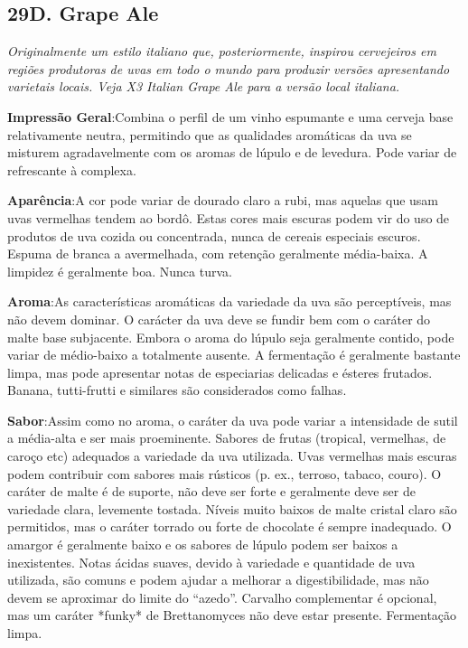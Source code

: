 \subsection*{29D. Grape Ale}
\textit{Originalmente um estilo italiano que, posteriormente, inspirou cervejeiros em regiões produtoras de uvas em todo o mundo para produzir versões apresentando varietais locais. Veja X3 Italian Grape Ale para a versão local italiana.}

\textbf{Impressão Geral}:Combina o perfil de um vinho espumante e uma cerveja base relativamente neutra, permitindo que as qualidades aromáticas da uva se misturem agradavelmente com os aromas de lúpulo e de levedura. Pode variar de refrescante à complexa.

\textbf{Aparência}:A cor pode variar de dourado claro a rubi, mas aquelas que usam uvas vermelhas tendem ao bordô. Estas cores mais escuras podem vir do uso de produtos de uva cozida ou concentrada, nunca de cereais especiais escuros. Espuma de branca a avermelhada, com retenção geralmente média-baixa. A limpidez é geralmente boa. Nunca turva.

\textbf{Aroma}:As características aromáticas da variedade da uva são perceptíveis, mas não devem dominar. O carácter da uva deve se fundir bem com o caráter do malte base subjacente. Embora o aroma do lúpulo seja geralmente contido, pode variar de médio-baixo a totalmente ausente. A fermentação é geralmente bastante limpa, mas pode apresentar notas de especiarias delicadas e ésteres frutados. Banana, tutti-frutti e similares são considerados como falhas.

\textbf{Sabor}:Assim como no aroma, o caráter da uva pode variar a intensidade de sutil a média-alta e ser mais proeminente. Sabores de frutas (tropical, vermelhas, de caroço etc) adequados a variedade da uva utilizada. Uvas vermelhas mais escuras podem contribuir com sabores mais rústicos (p. ex., terroso, tabaco, couro). O caráter de malte é de suporte, não deve ser forte e geralmente deve ser de variedade clara, levemente tostada. Níveis muito baixos de malte cristal claro são permitidos, mas o caráter torrado ou forte de chocolate é sempre inadequado. O amargor é geralmente baixo e os sabores de lúpulo podem ser baixos a inexistentes. Notas ácidas suaves, devido à variedade e quantidade de uva utilizada, são comuns e podem ajudar a melhorar a digestibilidade, mas não devem se aproximar do limite do “azedo”. Carvalho complementar é opcional, mas um caráter *funky* de Brettanomyces não deve estar presente. Fermentação limpa.

